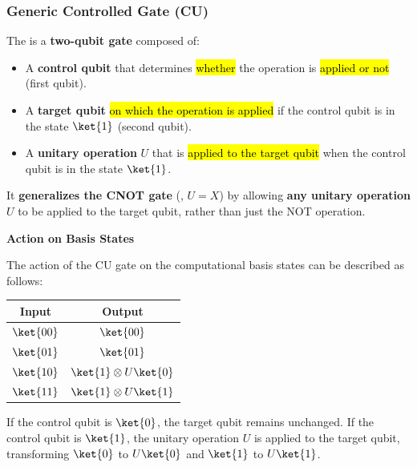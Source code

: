 \subsubsection{Generic Controlled Gate (CU)}\label{sec:generic-controlled-gate-cu}

The  is a \textbf{two-qubit gate} composed of:
\begin{itemize}
    \item A \textbf{control qubit} that determines \hl{whether} the operation is \hl{applied or not} (first qubit).
    \item A \textbf{target qubit} \hl{on which the operation is applied} if the control qubit is in the state $\ket{1}$ (second qubit).
    \item A \textbf{unitary operation} $U$ that is \hl{applied to the target qubit} when the control qubit is in the state $\ket{1}$.
\end{itemize}
It \textbf{generalizes the CNOT gate} (, $U = X$) by allowing \textbf{any unitary operation} $U$ to be applied to the target qubit, rather than just the NOT operation.

\highspace
\begin{flushleft}
    \textcolor{Green3}{ \textbf{Action on Basis States}}
\end{flushleft}
The action of the CU gate on the computational basis states can be described as follows:

\begin{table}[!htp]
    \centering
    \begin{tabular}{@{} c | c @{}}
        \toprule
        \textbf{Input} & \textbf{Output} \\
        \midrule
        $\ket{00}$ & $\ket{00}$ \\
        $\ket{01}$ & $\ket{01}$ \\
        $\ket{10}$ & $\ket{1} \otimes U\ket{0}$ \\
        $\ket{11}$ & $\ket{1} \otimes U\ket{1}$ \\
        \bottomrule
    \end{tabular}
\end{table}

\noindent
If the control qubit is $\ket{0}$, the target qubit remains unchanged. If the control qubit is $\ket{1}$, the unitary operation $U$ is applied to the target qubit, transforming $\ket{0}$ to $U\ket{0}$ and $\ket{1}$ to $U\ket{1}$.

